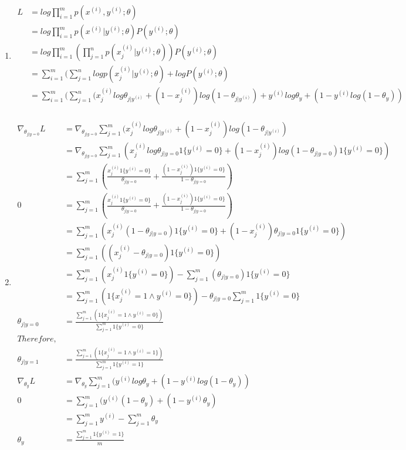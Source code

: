 \documentclass[submit]{harvardml}
\begin{document}
\begin{enumerate}[label=(\alph*)]
\item 
\begin{align*}
L&=log \prod_{i=1}^m p(x^{(i)},y^{(i)};\theta)\\
&=log \prod_{i=1}^m p(x^{(i)}|y^{(i)};\theta)P(y^{(i)};\theta)\\
&=log \prod_{i=1}^m(\prod_{j=1}^n p(x_j^{(i)}|y^{(i)};\theta))P(y^{(i)};\theta)\\
&=\sum_{i=1}^m (\sum_{j=1}^n log p(x_j^{(i)}|y^{(i)};\theta)+log P(y^{(i)};\theta)\\
&=\sum_{i=1}^m (\sum_{j=1}^n(x_j^{(i)}log\theta_{j|y^{(i)}}+(1-x_j^{(i)})log(1-\theta_{j|y^{(i)}})+y^{(i)}log\theta_y+(1-y^{(i)}log(1-\theta_y))\\
\end{align*}

\item\begin{align*}
\nabla_{\theta_{j|y=0}}L&=\nabla_{\theta_{j|y=0}}\sum_{j=1}^m(x_j^{(i)}log\theta_{j|y^{(i)}}+(1-x_j^{(i)})log(1-\theta_{j|y^{(i)}})\\
&=\nabla_{\theta_{j|y=0}}\sum_{j=1}^m(x_j^{(i)}log\theta_{j|y=0}1\{y^{(i)}=0\}+(1-x_j^{(i)})log(1-\theta_{j|y=0})1\{y^{(i)}=0\})\\
&=\sum_{j=1}^m (\frac{x_j^{(i)}1\{y^{(i)}=0\}}{\theta_{j|y=0}}+\frac{(1-x_j^{(i)})1\{y^{(i)}=0\}}{1-\theta_{j|y=0}})\\
0&=\sum_{j=1}^m (\frac{x_j^{(i)}1\{y^{(i)}=0\}}{\theta_{j|y=0}}+\frac{(1-x_j^{(i)})1\{y^{(i)}=0\}}{1-\theta_{j|y=0}})\\
&=\sum_{j=1}^m (x_j^{(i)}(1-\theta_{j|y=0})1\{y^{(i)}=0\}+(1-x_j^{(i)})\theta_{j|y=0}1\{y^{(i)}=0\})\\
&=\sum_{j=1}^m((x_j^{(i)}-\theta_{j|y=0})1\{y^{(i)}=0\})\\
&=\sum_{j=1}^m (x_j^{(i)}1\{y^{(i)}=0\})-\sum_{j=1}^m (\theta_{j|y=0})1\{y^{(i)}=0\}\\
&=\sum_{j=1}^m (1\{x_j^{(i)}=1\wedge y^{(i)}=0\})-\theta_{j|y=0} \sum_{j=1}^m 1\{y^{(i)}=0\}\\
\theta_{j|y=0} &=\frac{\sum_{j=1}^m (1\{x_j^{(i)}=1\wedge y^{(i)}=0\})}{\sum_{j=1}^m 1\{y^{(i)}=0\}}\\
Therefore, \\
\theta_{j|y=1} &=\frac{\sum_{j=1}^m (1\{x_j^{(i)}=1\wedge y^{(i)}=1\})}{\sum_{j=1}^m 1\{y^{(i)}=1\}}\\
\nabla_{\theta_{y}}L&=\nabla_{\theta_{y}}\sum_{j=1}^m(y^{(i)}log\theta_y+(1-y^{(i)}log(1-\theta_y))\\
0&=\sum_{j=1}^m(y^{(i)}(1-\theta_y)+(1-y^{(i)}\theta_y)\\
&=\sum_{j=1}^m y^{(i)}-\sum_{j=1}^m \theta_y\\
\theta_y&=\frac{\sum_{j=1}^m 1\{y^{(i)}=1\}}{m}
\end{align*}


\end{enumerate}
\end{document}
